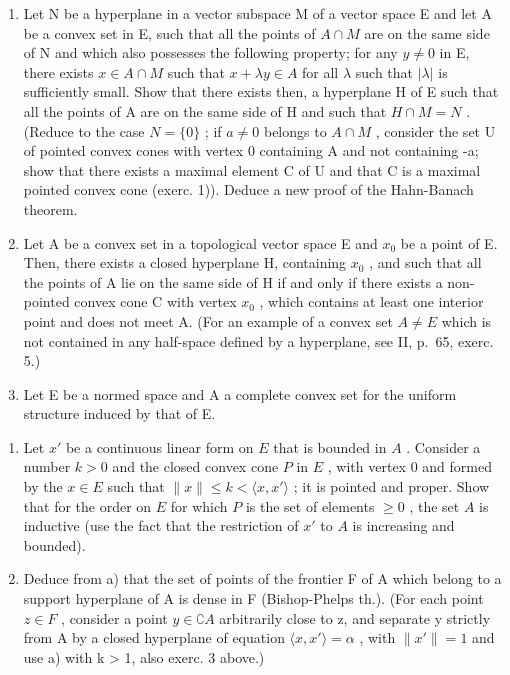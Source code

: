 \begin{enumerate}
\def\labelenumi{\arabic{enumi})}
\setcounter{enumi}{1}
\item
  Let N be a hyperplane in a vector subspace M of a vector space E and let A be a convex set in E, such that all the points of \(A \cap M\) are on the same side of N and which also possesses the following property; for any \(y \neq 0\) in E, there exists \(x \in A \cap M\) such that \(x + \lambda y \in A\) for all \(\lambda\) such that \(|\lambda|\) is sufficiently small. Show that there exists then, a hyperplane H of E such that all the points of A are on the same side of H and such that \(H \cap M = N\) . (Reduce to the case \(N = \{0\}\) ; if \(a \neq 0\) belongs to \(A \cap M\) , consider the set U of pointed convex cones with vertex 0 containing A and not containing -a; show that there exists a maximal element C of U and that C is a maximal pointed convex cone (exerc. 1)). Deduce a new proof of the Hahn-Banach theorem.
\item
  Let A be a convex set in a topological vector space E and \(x_{0}\) be a point of E. Then, there exists a closed hyperplane H, containing \(x_{0}\) , and such that all the points of A lie on the same side of H if and only if there exists a non-pointed convex cone C with vertex \(x_{0}\) , which contains at least one interior point and does not meet A. (For an example of a convex set \(A \neq E\) which is not contained in any half-space defined by a hyperplane, see II, p.~65, exerc. 5.)
\item
  Let E be a normed space and A a complete convex set for the uniform structure induced by that of E.
\end{enumerate}

\begin{enumerate}
\def\labelenumi{\alph{enumi})}
\item
  Let \(x'\) be a continuous linear form on \(E\) that is bounded in \(A\) . Consider a number \(k > 0\) and the closed convex cone \(P\) in \(E\) , with vertex 0 and formed by the \(x \in E\) such that \(\| x \| \leqslant k < \langle x, x' \rangle\) ; it is pointed and proper. Show that for the order on \(E\) for which \(P\) is the set of elements \(\geqslant 0\) , the set \(A\) is inductive (use the fact that the restriction of \(x'\) to \(A\) is increasing and bounded).
\item
  Deduce from a) that the set of points of the frontier F of A which belong to a support hyperplane of A is dense in F (Bishop-Phelps th.). (For each point \(z \in F\) , consider a point \(y \in \complement A\) arbitrarily close to z, and separate y strictly from A by a closed hyperplane of equation \(\langle x, x' \rangle = \alpha\) , with \(\|x' \| = 1\) and use a) with k > 1, also exerc. 3 above.)
\end{enumerate}

